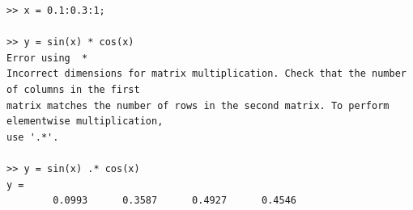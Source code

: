 
\begin{lstlisting}
>> x = 0.1:0.3:1;

>> y = sin(x) * cos(x)
Error using  * 
Incorrect dimensions for matrix multiplication. Check that the number of columns in the first
matrix matches the number of rows in the second matrix. To perform elementwise multiplication, 
use '.*'.

>> y = sin(x) .* cos(x)
y =
		0.0993		0.3587		0.4927		0.4546
\end{lstlisting}

